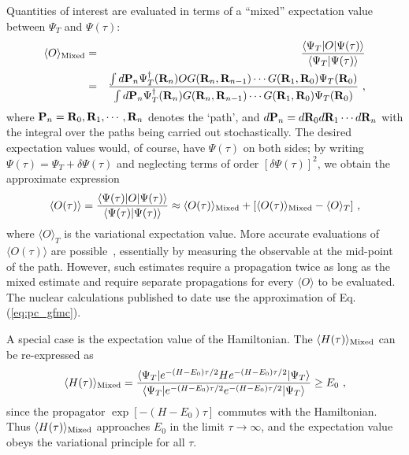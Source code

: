 Quantities of interest are evaluated in terms of a ``mixed'' expectation value
between $\Psi_T$ and $\Psi(\tau)$:
\begin{eqnarray}
\langle O \rangle_{\rm Mixed} & = & \frac{\langle \Psi_{T} | O |
\Psi(\tau)\rangle}{\langle \Psi_{T} | \Psi(\tau)\rangle} \nonumber \\
& = & \frac{ \int d {\bf P}_n
\Psi_{T}^{\dagger}({\bf R}_{n}) O G({\bf R}_{n},{\bf
R}_{n-1})\cdots G({\bf R}_{1},{\bf R}_{0})\Psi_{T}({\bf R}_{0})}
{\int d{\bf P}_{n} \Psi_{T}^{\dagger}
({\bf R}_{n})G({\bf R}_{n},{\bf R}_{n-1}) \cdots G({\bf
R}_{1},{\bf R}_{0})\Psi_{T}({\bf R}_{0})}~,
\label{eq:expectation}
\end{eqnarray}
where ${\bf P}_{n} = {\bf R}_{0},{\bf R}_{1},\cdots,{\bf R}_{n}$ denotes the
`path', and
$d{\bf P}_{n} = d{\bf R}_{0} d{\bf R}_{1}\cdots d{\bf R}_{n}$ with
the integral over the paths being carried out stochastically.
The desired expectation values would, of course, have $\Psi(\tau)$ on both
sides; by writing
$\Psi(\tau) = \Psi_{T} + \delta\Psi(\tau)$ 
and neglecting terms of order $[\delta\Psi(\tau)]^2$, we obtain the approximate
expression
\begin{eqnarray}
\langle O (\tau)\rangle =
\frac{\langle\Psi(\tau)| O |\Psi(\tau)\rangle}
{\langle\Psi(\tau)|\Psi(\tau)\rangle}
\approx \langle O (\tau)\rangle_{\rm Mixed}
     + [\langle O (\tau)\rangle_{\rm Mixed} - \langle O \rangle_T] ~,
\label{eq:pc_gfmc}
\end{eqnarray}
where $\langle O \rangle_T$ is the variational expectation value.
More accurate evaluations of $\langle O (\tau)\rangle$ are possible~\cite{K67},
essentially by measuring the observable at the mid-point of the path.
However, such estimates require a propagation twice as long as the mixed
estimate and require separate propagations for every $\langle O \rangle$
to be evaluated.  The nuclear calculations published to date use the
approximation of Eq.(\ref{eq:pc_gfmc}).

A special case is the expectation value of the Hamiltonian.
The $\langle{H}(\tau)\rangle_{\rm Mixed}$ can be re-expressed as~\cite{CK79}
\begin{eqnarray}
\langle{H}(\tau)\rangle_{\rm Mixed} = \frac{\langle \Psi_{T} |
e^{-({H}-E_{0})\tau /2}{H} e^{-({H}-E_{0})\tau /2} |
\Psi_{T}\rangle}{\langle \Psi_{T} |e^{-({H}-E_{0})\tau /2}
e^{-({H}-E_{0})\tau /2}| \Psi_{T}\rangle} \geq E_{0}~,
\end{eqnarray}
since the propagator $\exp [ - (H - E_0) \tau ] $ commutes with the
Hamiltonian.
Thus $\langle{H}(\tau)\rangle_{\rm Mixed}$ approaches $E_{0}$ in the limit
$\tau\rightarrow\infty$, and the expectation value obeys the variational
principle for all $\tau$.

